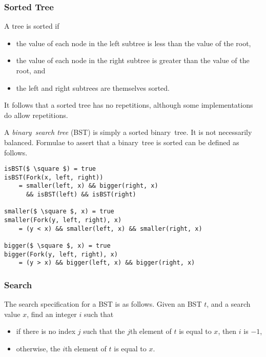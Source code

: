 \subsubsection{Sorted Tree}

A tree is sorted if
\begin{itemize}
  \item the value of each node in the left subtree is less than the value of the root,
  \item the value of each node in the right subtree is greater than the value of the root, and
  \item the left and right subtrees are themselves sorted.
\end{itemize}
It follows that a sorted tree has no repetitions, although some implementations do allow repetitions.

A \emph{binary~search tree} (BST) is simply a sorted binary~tree.
It is not necessarily balanced.
Formulae to assert that a binary~tree is sorted can be defined as follows.
\begin{lstlisting}[mathescape=true]
isBST($ \square $) = true
isBST(Fork(x, left, right))
    = smaller(left, x) && bigger(right, x)
      && isBST(left) && isBST(right)

smaller($ \square $, x) = true
smaller(Fork(y, left, right), x)
    = (y < x) && smaller(left, x) && smaller(right, x)

bigger($ \square $, x) = true
bigger(Fork(y, left, right), x)
    = (y > x) && bigger(left, x) && bigger(right, x)
\end{lstlisting}

\subsubsection{Search}

The search specification for a BST is as follows.
Given an BST \( t \), and a search value \( x \), find an integer \( i \) such that
\begin{itemize}
  \item if there is no index \( j \) such that the \( j \)th element of \( t \) is equal to \( x \), then \( i \) is \( -1 \),
  \item otherwise, the \( i \)th element of \( t \) is equal to \( x \).
\end{itemize}

